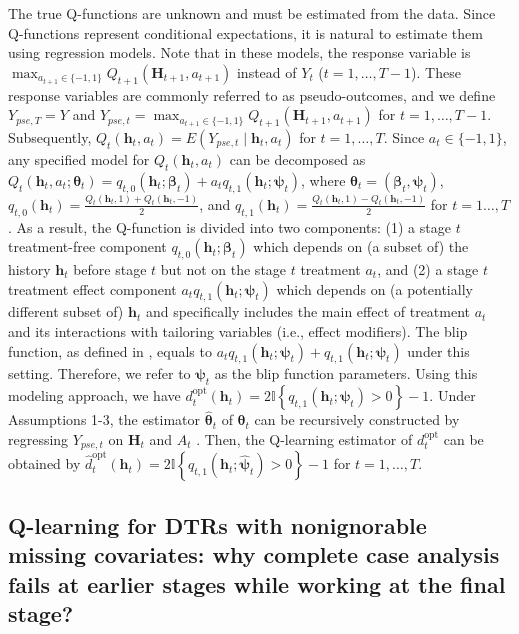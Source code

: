\documentclass[12pt]{article}
\begin{document}
The true Q-functions are unknown and must be estimated from the data. Since Q-functions represent conditional expectations, it is natural to estimate them using regression models. Note that in these models, the response variable is $\max _{a_{t+1} \in \{-1,1\}} Q_{t+1}\left(\bm{H}_{t+1}, a_{t+1}\right)$ instead of $Y_t$ ($t = 1,\ldots,T-1$). These response variables are commonly referred to as pseudo-outcomes, and we define $Y_{pse,T} = Y$ and $Y_{pse,t} = \max _{a_{t+1} \in \{-1,1\}} Q_{t+1}\left(\bm{H}_{t+1}, a_{t+1}\right)$ for $t = 1,\ldots,T-1$. Subsequently, $Q_t(\bm{h}_t,a_t) = E\left( Y_{pse,t}\mid \bm{h}_t,a_t \right)$ for $t = 1,\ldots,T$. Since $a_t \in \{-1,1\}$, any specified model for $Q_t(\bm{h}_t,a_t)$ can be decomposed as $Q_t(\bm{h}_t,a_t;\bm{\theta}_t) = q_{t,0}(\bm{h}_t; \bm{\beta}_t) + a_t q_{t,1}(\bm{h}_t;\bm{\psi}_t)$, where $\bm{\theta}_t = (\bm{\beta}_t, \bm{\psi}_t)$, $q_{t,0}(\bm{h}_t) = \frac{Q_t(\bm{h}_t,1) + Q_t(\bm{h}_t,-1)}{2}$, and $q_{t,1}(\bm{h}_t)  = \frac{Q_t(\bm{h}_t,1) - Q_t(\bm{h}_t,-1)}{2}$ for $t=1\ldots,T$. As a result, the Q-function is divided into two components: (1) a stage $t$ treatment-free component $ q_{t,0}(\bm{h}_t; \bm{\beta}_t)$ which depends on (a subset of) the history $\bm{h}_t$  before stage $t$ but not on the stage $t$ treatment $a_t$, and (2) a stage $t$ treatment effect component $a_tq_{t,1}(\bm{h}_t;\bm{\psi}_t)$ which depends on (a potentially different subset of) $\bm{h}_t$ and specifically includes the main effect of treatment $a_t$ and its interactions with tailoring variables (i.e., effect modifiers). The blip function, as defined in \cite{Chakraborty_Moodie_2013}, equals to $a_t q_{t,1}(\bm{h}_t;\bm{\psi}_t) + q_{t,1}(\bm{h}_t;\bm{\psi}_t)$ under this setting. Therefore, we refer to $\bm{\psi}_t$ as the blip function parameters. Using this modeling approach, we have $d_t^{\mathrm{opt}}(\bm{h}_t) = 2\mathbb I \left\{q_{t,1}(\bm{h}_t;\bm{\psi}_t)>0\right\} -1$. 
Under Assumptions 1-3, the estimator $\widehat{\bm{\theta}}_t$ of $\bm{\theta}_t$ can be recursively constructed by regressing $Y_{pse,t}$ on $\bm{H}_t$ and $A_t$ . Then, the Q-learning estimator of $d^{\mathrm{opt}}_t$ can be obtained by $\widehat{d}_t^{\mathrm{opt}}\left(\bm{h}_t\right) = 2\mathbb{I}\left\{q_{t,1}(\bm{h}_t;\widehat{\bm{\psi}}_t)>0\right\} -1$ for $t=1,\ldots,T$.


\subsection{Q-learning for DTRs with  nonignorable missing covariates: why complete case analysis fails at earlier stages while working at the final stage?}
\end{document}
